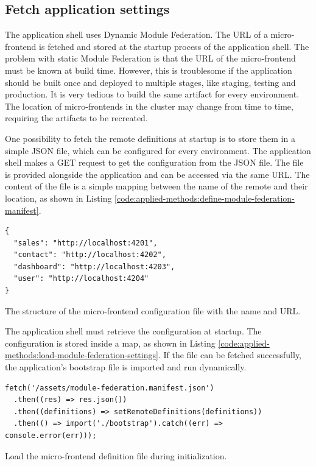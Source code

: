 \subsection{Fetch application settings}\label{subsection:applied-methods:prototypical-implementation
:load-remote-settings}

The application shell uses Dynamic Module Federation. The \ac{URL} of a micro-frontend is fetched and stored at the startup process of the application shell. The problem with static Module Federation is that the \ac{URL} of the micro-frontend must be known at build time. However, this is troublesome if the application should be built once and deployed to multiple stages, like staging, testing and production. It is very tedious to build the same artifact for every environment. The location of micro-frontends in the cluster may change from time to time, requiring the artifacts to be recreated.

\bigskip

\noindent One possibility to fetch the remote definitions at startup is to store them in a simple \ac{JSON} file, which can be configured for every environment. The application shell makes a GET request to get the configuration from the \ac{JSON} file. The file is provided alongside the application and can be accessed via the same \ac{URL}. The content of the file is a simple mapping between the name of the remote and their location, as shown in Listing \ref{code:applied-methods:define-module-federation-manifest}.

\ifshowListings
\begin{listing}[H]
\begin{verbatim}
{
  "sales": "http://localhost:4201",
  "contact": "http://localhost:4202",
  "dashboard": "http://localhost:4203",
  "user": "http://localhost:4204"
}
\end{verbatim}
\caption{The structure of the micro-frontend configuration file with the name and \ac{URL}.}\label{code:applied-methods:define-module-federation-manifest}
\end{listing}
\fi

\noindent The application shell must retrieve the configuration at startup. The configuration is stored inside a map, as shown in Listing \ref{code:applied-methods:load-module-federation-settings}. If the file can be fetched successfully, the application's bootstrap file is imported and run dynamically.

\ifshowListings
\begin{listing}[H]
\begin{verbatim}
fetch('/assets/module-federation.manifest.json')
  .then((res) => res.json())
  .then((definitions) => setRemoteDefinitions(definitions))
  .then(() => import('./bootstrap').catch((err) => console.error(err)));
\end{verbatim}
\caption{Load the micro-frontend definition file during initialization.}\label{code:applied-methods:load-module-federation-settings}
\end{listing}
\fi

